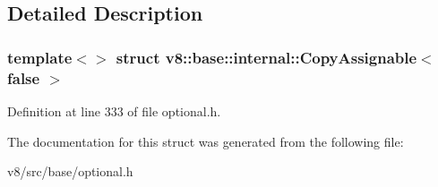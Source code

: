 \subsection{Detailed Description}
\subsubsection*{template$<$$>$\newline
struct v8\+::base\+::internal\+::\+Copy\+Assignable$<$ false $>$}



Definition at line 333 of file optional.\+h.



The documentation for this struct was generated from the following file\+:\begin{DoxyCompactItemize}
\item 
v8/src/base/optional.\+h\end{DoxyCompactItemize}
